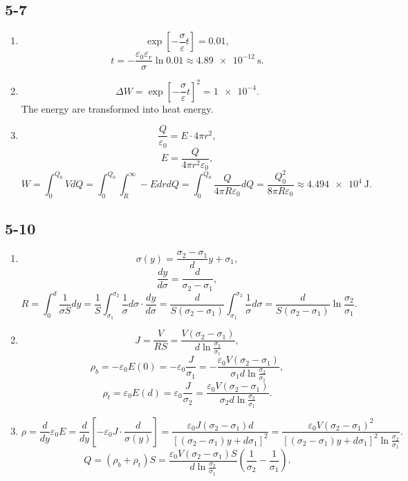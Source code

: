 \documentclass[11pt,a4paper]{article}
\author{\href{liuyh615@sjtu.edu.cn}{Yihao Liu} (515370910207)}
\subtitle{Homework}
\begin{document}
\maketitle

\subsection{5-7}
\begin{enumerate}[label=\alph*)]
\item
$$\exp\left[-\frac{\sigma}{\varepsilon}t\right]=0.01,$$
$$t=-\frac{\varepsilon_0\varepsilon_r}{\sigma}\ln0.01\approx \SI{4.89e-12}{\second}.$$
\item
$$\Delta W=\exp\left[-\frac{\sigma}{\varepsilon}t\right]^2=\num{1e-4}.$$
The energy are transformed into heat energy.
\item
$$\frac{Q}{\varepsilon_0}=E\cdot 4\pi r^2,$$
$$E=\frac{Q}{4\pi r^2\varepsilon_0},$$
$$W=\int_0^{Q_0} VdQ=\int_0^{Q_0}\int_R^\infty-EdrdQ=\int_0^{Q_0}\frac{Q}{4\pi R\varepsilon_0}dQ=\frac{Q_0^2}{8\pi R\varepsilon_0}\approx\SI{4.494e4}{\joule}.$$
\end{enumerate}

\subsection{5-10}
\begin{enumerate}[label=\alph*)]
\item
$$\sigma(y)=\frac{\sigma_2-\sigma_1}{d}y+\sigma_1,$$
$$\frac{dy}{d\sigma}=\frac{d}{\sigma_2-\sigma_1},$$
$$R=\int_0^d\frac{1}{\sigma S}dy=\frac{1}{S}\int_{\sigma_1}^{\sigma_2}\frac{1}{\sigma}d\sigma\cdot\frac{dy}{d\sigma}=\frac{d}{S(\sigma_2-\sigma_1)}\int_{\sigma_1}^{\sigma_2}\frac{1}{\sigma}d\sigma=\frac{d}{S(\sigma_2-\sigma_1)}\ln\frac{\sigma_2}{\sigma_1}.$$
\item
$$J=\frac{V}{RS}=\frac{V(\sigma_2-\sigma_1)}{d\ln\frac{\sigma_2}{\sigma_1}},$$
$$\rho_b=-\varepsilon_0E(0)=-\varepsilon_0\frac{J}{\sigma_1}=-\frac{\varepsilon_0V(\sigma_2-\sigma_1)}{\sigma_1d\ln\frac{\sigma_2}{\sigma_1}},$$
$$\rho_t=\varepsilon_0E(d)=\varepsilon_0\frac{J}{\sigma_2}=\frac{\varepsilon_0V(\sigma_2-\sigma_1)}{\sigma_2d\ln\frac{\sigma_2}{\sigma_1}}.$$
\item
$$\rho=\frac{d}{dy}\varepsilon_0E=\frac{d}{dy}\left[-\varepsilon_0J\cdot\frac{d}{\sigma(y)}\right]=\frac{\varepsilon_0J(\sigma_2-\sigma_1)d}{[(\sigma_2-\sigma_1)y+d\sigma_1]^2}=\frac{\varepsilon_0V(\sigma_2-\sigma_1)^2}{[(\sigma_2-\sigma_1)y+d\sigma_1]^2\ln\frac{\sigma_2}{\sigma_1}}.$$
$$Q=(\rho_b+\rho_t)S=\frac{\varepsilon_0V(\sigma_2-\sigma_1)S}{d\ln\frac{\sigma_2}{\sigma_1}}\left(\frac{1}{\sigma_2}-\frac{1}{\sigma_1}\right).$$
\end{enumerate}
\end{document}
